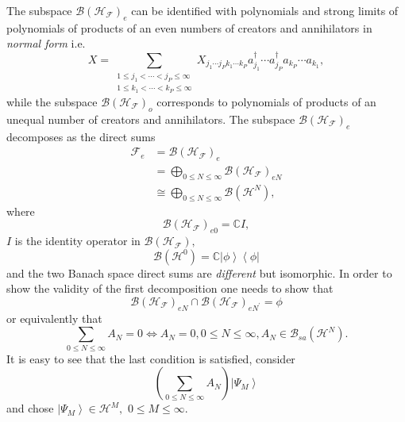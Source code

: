 \documentclass[aps,preprint]{revtex4}%
\begin{document}
The subspace $\mathcal{B}\left(  \mathcal{H}_{\mathcal{F}}\right)  _{e}$ can
be identified with polynomials and strong limits of polynomials of products of
an even numbers of creators and annihilators in \emph{normal form} i.e.%
\begin{equation}
X=\sum_{\substack{1\leq j_{1}<\cdots<j_{P}\leq\infty\\1\leq k_{1}<\cdots
<k_{P}\leq\infty}}X_{j_{1}\cdots j_{P}k_{1}\cdots k_{P}}a_{j_{1}}^{\dagger
}\cdots a_{j_{P}}^{\dagger}a_{k_{P}}\cdots a_{k_{1}},
\end{equation}
while the subspace $\mathcal{B}\left(  \mathcal{H}_{\mathcal{F}}\right)  _{o}$
corresponds to polynomials of products of an unequal number of creators and
annihilators. The subspace $\mathcal{B}\left(  \mathcal{H}_{\mathcal{F}%
}\right)  _{e}$ decomposes as the direct sums
\begin{align}
\mathcal{F}_{e} &  =\mathcal{B}\left(  \mathcal{H}_{\mathcal{F}}\right)
_{e}\nonumber\\
&  =%
{\displaystyle\bigoplus\limits_{0\leq N\leq\infty}}
\mathcal{B}\left(  \mathcal{H}_{\mathcal{F}}\right)  _{eN}\label{BanSp}\\
&  \cong%
{\displaystyle\bigoplus\limits_{0\leq N\leq\infty}}
\mathcal{B}\left(  \mathcal{H}^{N}\right)  ,\label{BanAlg}%
\end{align}
where
\begin{equation}
\mathcal{B}\left(  \mathcal{H}_{\mathcal{F}}\right)  _{e0}=\mathbb{C}I,
\end{equation}
$I$ is the identity operator in $\mathcal{B}\left(  \mathcal{H}_{\mathcal{F}%
}\right)  ,$%
\begin{equation}
\mathcal{B}\left(  \mathcal{H}^{0}\right)  =\mathbb{C}\left\vert
\phi\right\rangle \left\langle \phi\right\vert
\end{equation}
and the two Banach space direct sums are \emph{different} but isomorphic. In
order to show the validity of the first decomposition one needs to show that
\begin{equation}
\mathcal{B}\left(  \mathcal{H}_{\mathcal{F}}\right)  _{eN}\cap\mathcal{B}%
\left(  \mathcal{H}_{\mathcal{F}}\right)  _{eN^{\prime}}=\phi
\end{equation}
or equivalently that
\begin{equation}
\sum_{0\leq N\leq\infty}A_{N}=0\Leftrightarrow A_{N}=0,0\leq N\leq\infty
,A_{N}\in\mathcal{B}_{sa}\left(  \mathcal{H}^{N}\right)  .
\end{equation}
It is easy to see that the last condition is satisfied, consider
\begin{equation}
\left(  \sum_{0\leq N\leq\infty}A_{N}\right)  \left\vert \Psi_{M}%
\right\rangle
\end{equation}
and chose $\left\vert \Psi_{M}\right\rangle \in\mathcal{H}^{M},$ $0\leq
M\leq\infty.$
\end{document}
